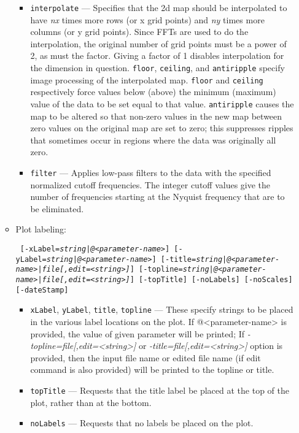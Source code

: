 \begin{itemize}
\begin{itemize}
\begin{itemize}
        \item \verb|interpolate| --- Specifies that the 2d map should be interpolated to have {\em nx} times
        more rows (or x grid points) and {\em ny} times more columns (or y grid points).  Since FFTs are used to
        do the interpolation, the original number of grid points must be a power of 2, as must the factor.  Giving
        a factor of 1 disables interpolation for the dimension in question.  \verb|floor|, \verb|ceiling|,
        and \verb|antiripple| specify image processing of the interpolated map.  \verb|floor| and \verb|ceiling|
        respectively force values below (above) the minimum (maximum) value of the data to be set equal to that
        value.  \verb|antiripple| causes the map to be altered so that non-zero values in the new map between
        zero values on the original map are set to zero; this suppresses ripples that sometimes occur in regions
        where the data was originally all zero.
        \item \verb|filter| --- Applies low-pass filters to the data with the specified normalized cutoff 
        frequencies.  The integer cutoff values give the number of frequencies starting at the Nyquist frequency
        that are to be eliminated.  
        \end{itemize}
    \item Plot labeling:
\begin{flushleft}{\tt
[-xLabel={\em string|@<parameter-name>}] [-yLabel={\em string|@<parameter-name>}] [-title={\em string|@<parameter-name>|file[,edit=<string>]}] [-topline={\em string|@<parameter-name>|file[,edit=<string>]}] [-topTitle] [-noLabels]
[-noScales] [-dateStamp] 
}\end{flushleft}
        \begin{itemize}
        \item \verb|xLabel|, \verb|yLabel|, \verb|title|, \verb|topline| --- These specify strings to be placed
                in the various label locations on the plot. If @<parameter-name> is provided, the value of given parameter will be printed; If {\em-topline=file[,edit=<string>]} or {\em-title=file[,edit=<string>]} option is provided, then the input file name or edited file name (if edit command is also provided) will be printed to the topline or title.
        \item \verb|topTitle| --- Requests that the title label be placed at the top of the plot, rather than
                at the bottom.
        \item \verb|noLabels| --- Requests that no labels be placed on the plot.

\end{itemize}
\end{itemize}
\end{itemize}
